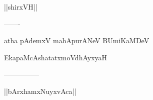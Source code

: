 \documentclass{article}
\begin{document}
\begin{center}
||shirxVH||
\end{center}

\begin{center}
-------
\end{center}

\begin{center}
atha pAdemxV mahApurANeV BUmiKaMDeV
\end{center}

\begin{center}
EkapaMcAshatatxmoVdhAyxyaH
\end{center}

\begin{center}
---------------
\end{center}

\begin{center}
||bArxhamxNuyxvAca||
\end{center}
\end{document}
